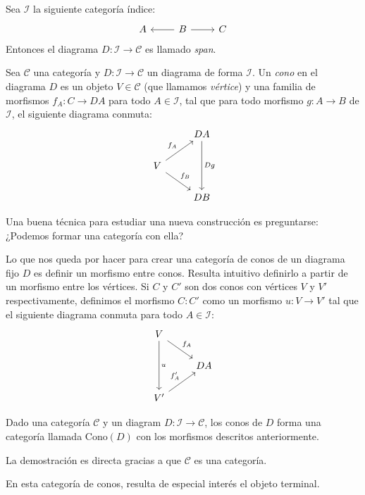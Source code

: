 \documentclass[12pt, twoside]{book}
\newcommand{\cat}{{\mathcal{C}}}
\begin{document}
\begin{example}\label{ejemplo-span}
Sea $\mathcal{I}$ la siguiente categoría índice:
\[ \begin{tikzcd}
A & B \arrow[l] \arrow[r] & C
\end{tikzcd} \]
Entonces el diagrama $D \colon \mathcal{I} \to \cat$ es llamado \emph{span}.
\end{example}

\begin{definition}
Sea $\cat$ una categoría y $D \colon \mathcal{I} \to \cat$ un diagrama de forma $\mathcal{I}$.
Un \emph{cono} en el diagrama $D$ es un objeto $V \in \cat$ (que llamamos \emph{vértice}) y una familia de morfismos $f_A \colon C \to D A$ para todo $A \in \mathcal{I}$, tal que para todo morfismo $g \colon A \to B$ de $\mathcal{I}$, el siguiente diagrama conmuta:
\[ \begin{tikzcd}
 & D A \arrow[dd,"D g"]\\
V \arrow[ur,"f_A"] \arrow[dr,"f_B"]\\
 & D B
\end{tikzcd} \]
\end{definition}

Una buena técnica para estudiar una nueva construcción es preguntarse: ¿Podemos formar una categoría con ella?

Lo que nos queda por hacer para crear una categoría de conos de un diagrama fijo $D$ es definir un morfismo entre conos.
Resulta intuitivo definirlo a partir de un morfismo entre los vértices.
Si $C$ y $C'$ son dos conos con vértices $V$ y $V'$ respectivamente, definimos el morfismo $C \colon C'$ como un morfismo $u \colon V \to V'$ tal que el siguiente diagrama conmuta para todo $A \in \mathcal{I}$:
\[ \begin{tikzcd}
V \arrow[dr,"f_A"] \arrow[dd,"u"] &\\
 & D A\\
V' \arrow[ur,"f'_A"]
\end{tikzcd} \]

\begin{proposition}
Dado una categoría $\cat$ y un diagram $D \colon \mathcal{I} \to \cat$, los conos de $D$ forma una categoría llamada $\text{Cono}(D)$ con los morfismos descritos anteriormente.
\end{proposition}
La demostración es directa gracias a que $\cat$ es una categoría.

En esta categoría de conos, resulta de especial interés el objeto terminal.
\end{document}
